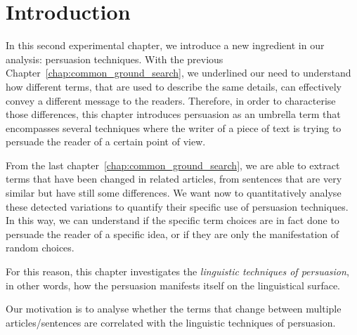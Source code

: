 \label{chap:linguistic_persuasion}

\section{\statusgreen Introduction}
\label{sec:lp_intro}

In this second experimental chapter, we introduce a new ingredient in our analysis: persuasion techniques.
With the previous Chapter~\ref{chap:common_ground_search}, we underlined our need to understand how different terms, that are used to describe the same details, can effectively convey a different message to the readers.
Therefore, in order to characterise those differences, this chapter introduces \gls{persuasion} as an umbrella term that encompasses several techniques where the writer of a piece of text is trying to persuade the reader of a certain point of view.

From the last chapter~\ref{chap:common_ground_search}, 
we are able to extract terms that have been changed in related articles, from sentences that are very similar but have still some differences.
We want now to quantitatively analyse these detected variations to quantify their specific use of persuasion techniques.
In this way, we can understand if the specific term choices are in fact done to persuade the reader of a specific idea, or if they are only the manifestation of random choices.

For this reason, this chapter investigates the \emph{linguistic techniques of persuasion}, in other words, how the persuasion manifests itself on the linguistical surface.

Our motivation is to analyse whether the terms that change between multiple articles/sentences are correlated with the linguistic techniques of persuasion.

